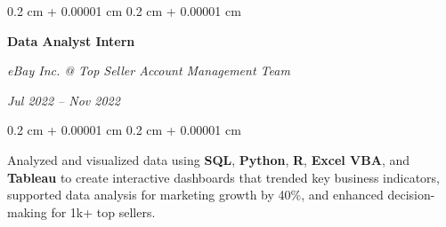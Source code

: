 \documentclass[10pt, letterpaper]{article}
\newenvironment{highlights}{
    \begin{itemize}[
        topsep=0.10 cm,
        parsep=0.10 cm,
        partopsep=0pt,
        itemsep=0pt,
        leftmargin=0.4 cm + 10pt
    ]
}{
    \end{itemize}
} %
\newenvironment{onecolentry}{
    \begin{adjustwidth}{
        0.2 cm + 0.00001 cm
    }{
        0.2 cm + 0.00001 cm
    }
}{
    \end{adjustwidth}
} %
\newenvironment{twocolentry}[2][]{
    \onecolentry
    \def\secondColumn{#2}
    \setcolumnwidth{\fill, 4.5 cm}
    \begin{paracol}{2}
}{
    \switchcolumn \raggedleft \secondColumn
    \end{paracol}
    \endonecolentry
} %
\begin{document}
        \begin{twocolentry}{
        \textit{Jul 2022 – Nov 2022}}
            \textbf{Data Analyst Intern}

            \textit{eBay Inc. @ Top Seller Account Management Team}
        \end{twocolentry}
        \begin{onecolentry}
            \begin{highlights}
                Analyzed and visualized data using \textbf{SQL}, \textbf{Python}, \textbf{R}, \textbf{Excel VBA}, and \textbf{Tableau} to create interactive dashboards that trended key business indicators, supported data analysis for marketing growth by 40\%, and enhanced decision-making for 1k+ top sellers.
            \end{highlights}
        \end{onecolentry}





\end{document}
